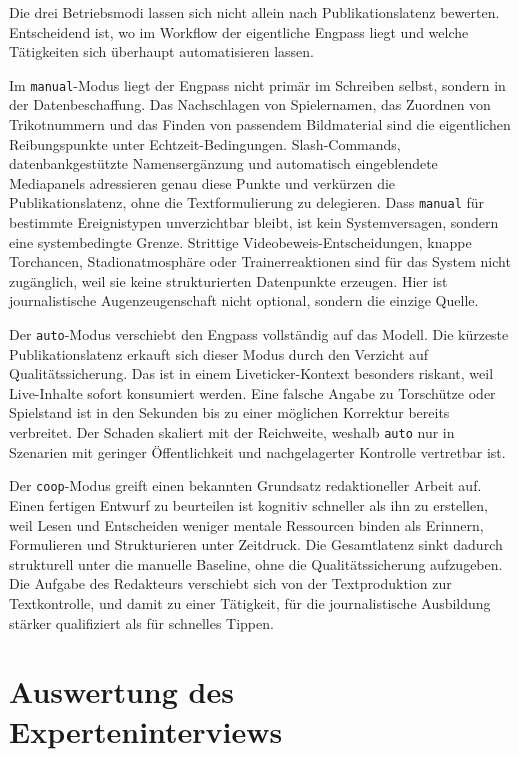 Die drei Betriebsmodi lassen sich nicht allein nach Publikationslatenz bewerten. Entscheidend ist, wo im Workflow der eigentliche Engpass liegt und welche Tätigkeiten sich überhaupt automatisieren lassen.

Im \texttt{manual}-Modus liegt der Engpass nicht primär im Schreiben selbst, sondern in der Datenbeschaffung. Das Nachschlagen von Spielernamen, das Zuordnen von Trikotnummern und das Finden von passendem Bildmaterial sind die eigentlichen Reibungspunkte unter Echtzeit-Bedingungen. Slash-Commands, datenbankgestützte Namensergänzung und automatisch eingeblendete Mediapanels adressieren genau diese Punkte und verkürzen die Publikationslatenz, ohne die Textformulierung zu delegieren. Dass \texttt{manual} für bestimmte Ereignistypen unverzichtbar bleibt, ist kein Systemversagen, sondern eine systembedingte Grenze. Strittige Videobeweis-Entscheidungen, knappe Torchancen, Stadionatmosphäre oder Trainerreaktionen sind für das System nicht zugänglich, weil sie keine strukturierten Datenpunkte erzeugen. Hier ist journalistische Augenzeugenschaft nicht optional, sondern die einzige Quelle.

Der \texttt{auto}-Modus verschiebt den Engpass vollständig auf das Modell. Die kürzeste Publikationslatenz erkauft sich dieser Modus durch den Verzicht auf Qualitätssicherung. Das ist in einem Liveticker-Kontext besonders riskant, weil Live-Inhalte sofort konsumiert werden. Eine falsche Angabe zu Torschütze oder Spielstand ist in den Sekunden bis zu einer möglichen Korrektur bereits verbreitet. Der Schaden skaliert mit der Reichweite, weshalb \texttt{auto} nur in Szenarien mit geringer Öffentlichkeit und nachgelagerter Kontrolle vertretbar ist.

Der \texttt{coop}-Modus greift einen bekannten Grundsatz redaktioneller Arbeit auf. Einen fertigen Entwurf zu beurteilen ist kognitiv schneller als ihn zu erstellen, weil Lesen und Entscheiden weniger mentale Ressourcen binden als Erinnern, Formulieren und Strukturieren unter Zeitdruck. Die Gesamtlatenz sinkt dadurch strukturell unter die manuelle Baseline, ohne die Qualitätssicherung aufzugeben. Die Aufgabe des Redakteurs verschiebt sich von der Textproduktion zur Textkontrolle, und damit zu einer Tätigkeit, für die journalistische Ausbildung stärker qualifiziert als für schnelles Tippen.


\section{Auswertung des Experteninterviews}\label{experteninterview-auswertung}

